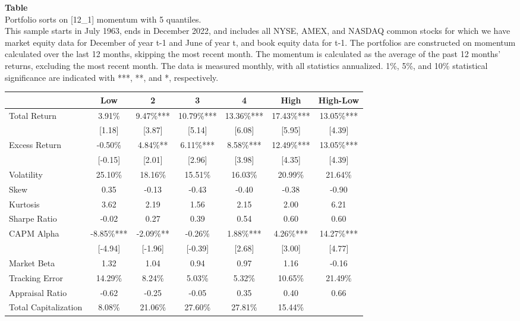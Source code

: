 \begin{table*}[ht!]
\raggedright
{}
\label{tab: quantile_sort_mom_[12_1]_with_5_quantiles}
\textbf{Table \thetable} \\
Portfolio sorts on [12\_1] momentum with 5 quantiles. \\
\hspace*{1em}This sample starts in July 1963, ends in December 2022, and includes all NYSE, AMEX, and NASDAQ common stocks for which we have market equity data for December of year t-1 and June of year t, and book equity data for t-1. The portfolios are constructed on momentum calculated over the last 12 months, skipping the most recent month. The momentum is calculated as the average of the past 12 months' returns, excluding the most recent month. The data is measured monthly, with all statistics annualized.  1\%, 5\%, and 10\% statistical significance are indicated with ***, **, and *, respectively. \\
\vspace{0.5em}
\centering
\begin{adjustbox}{max width=\textwidth}
\begin{tabular}{@{}lcccccc@{}}
\toprule
 & Low & 2 & 3 & 4 & High & High-Low \\
\midrule
Total Return & 3.91\% & 9.47\%*** & 10.79\%*** & 13.36\%*** & 17.43\%*** & 13.05\%*** \\
 & [1.18] & [3.87] & [5.14] & [6.08] & [5.95] & [4.39] \\
Excess Return & -0.50\% & 4.84\%** & 6.11\%*** & 8.58\%*** & 12.49\%*** & 13.05\%*** \\
 & [-0.15] & [2.01] & [2.96] & [3.98] & [4.35] & [4.39] \\
Volatility & 25.10\% & 18.16\% & 15.51\% & 16.03\% & 20.99\% & 21.64\% \\
Skew & 0.35 & -0.13 & -0.43 & -0.40 & -0.38 & -0.90 \\
Kurtosis & 3.62 & 2.19 & 1.56 & 2.15 & 2.00 & 6.21 \\
Sharpe Ratio & -0.02 & 0.27 & 0.39 & 0.54 & 0.60 & 0.60 \\
CAPM Alpha & -8.85\%*** & -2.09\%** & -0.26\% & 1.88\%*** & 4.26\%*** & 14.27\%*** \\
 & [-4.94] & [-1.96] & [-0.39] & [2.68] & [3.00] & [4.77] \\
Market Beta & 1.32 & 1.04 & 0.94 & 0.97 & 1.16 & -0.16 \\
Tracking Error & 14.29\% & 8.24\% & 5.03\% & 5.32\% & 10.65\% & 21.49\% \\
Appraisal Ratio & -0.62 & -0.25 & -0.05 & 0.35 & 0.40 & 0.66 \\
Total Capitalization & 8.08\% & 21.06\% & 27.60\% & 27.81\% & 15.44\% &  \\
\bottomrule
\end{tabular}
\end{adjustbox}
\end{table*}